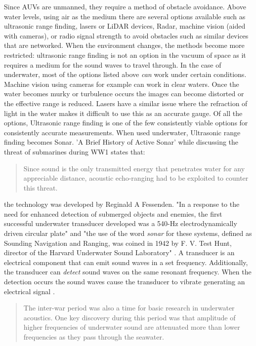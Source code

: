 \documentclass[11pt,a4paper,titlepage]{report}
\begin{document}
	Since AUVs are unmanned, they require a method of obstacle avoidance. Above water levels, using air as the medium there are several options available such as ultrasonic range finding, lasers or LiDAR devices, Radar, machine vision (aided with cameras), or radio signal strength to avoid obstacles such as similar devices that are networked. When the environment changes, the methods become more restricted: ultrasonic range finding is not an option in the vacuum of space as it requires a medium for the sound waves to travel through. In the case of underwater, most of the options listed above \textit{can} work under certain conditions. Machine vision using cameras for example can work in clear waters. Once the water becomes murky or turbulence occurs the images can become distorted or the effective range is reduced. Lasers have a similar issue where the refraction of light in the water makes it difficult to use this as an accurate gauge. Of all the options, Ultrasonic range finding is one of the few consistently viable options for consistently accurate measurements. When used underwater, Ultrasonic range finding becomes Sonar. 'A Brief History of Active Sonar' while discussing the threat of submarines during WW1 states that:
	
	\begin{quote}
		Since sound is the only transmitted energy that penetrates water for any appreciable distance, acoustic echo-ranging had to be exploited to counter this threat. \cite{ACTIVESONAR_HISTORY}
	\end{quote}
	
	the technology was developed by Reginald A Fessenden. "In a response to the need for enhanced detection of submerged objects and enemies, the first successful underwater transducer developed was a 540-\unit{\hertz} electrodynamically driven circular plate"\cite{ACTIVESONAR_HISTORY} and "the use of the word \textit{sonar} for these systems, defined as Sounding Navigation and Ranging, was coined in 1942 by F. V. Test Hunt, director of the Harvard Underwater Sound Laboratory" \cite{ACTIVESONAR_HISTORY}. A transducer is an electrical component that can emit sound waves in a set frequency. Additionally, the transducer can \textit{detect} sound waves on the same resonant frequency. When the detection occurs the sound waves cause the transducer to vibrate generating an electrical signal \cite{TRANSDUCER_YOUTUBE}.
	
	\begin{quote}
		The inter-war period was also a time for basic research in underwater acoustics. One key discovery during this period was that amplitude of higher frequencies of underwater sound are attenuated more than lower frequencies as they pass through the seawater. \cite{ACTIVESONAR_HISTORY}
	\end{quote}
	
\end{document}
